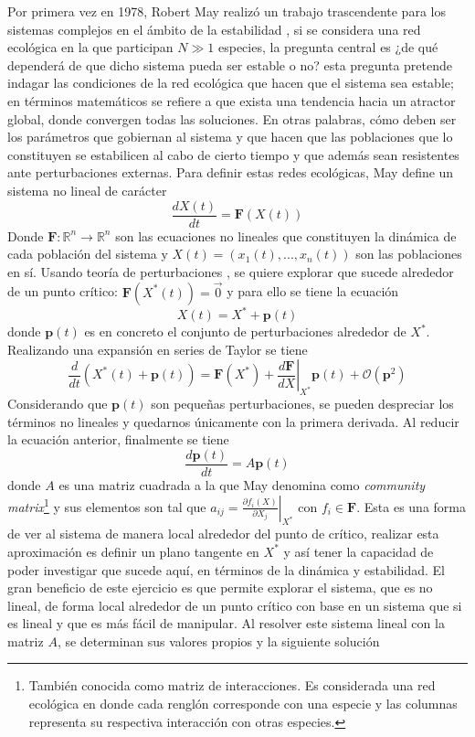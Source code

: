 Por primera vez en 1978, Robert May realizó un trabajo trascendente para los sistemas complejos en el ámbito de la estabilidad \cite{may1972will}, si se considera una red ecológica en la que participan $N\gg 1$ especies, la pregunta central es ¿de qué dependerá de que dicho sistema pueda ser estable o no? esta pregunta pretende indagar las condiciones de la red ecológica que hacen que el sistema sea estable; en términos matemáticos se refiere a que exista una tendencia hacia un atractor global, donde convergen todas las soluciones. En otras palabras, cómo deben ser los parámetros que gobiernan al sistema y que hacen que las poblaciones que lo constituyen se estabilicen al cabo de cierto tiempo y que además sean resistentes ante perturbaciones externas. Para definir estas redes ecológicas, May define un sistema no lineal de carácter
$$\frac{dX(t)}{dt}=\textbf{F}(X(t))$$
Donde $\textbf{F}:\mathbb{R}^n\to\mathbb{R}^n$ son las ecuaciones no lineales que constituyen la dinámica de cada población del sistema y $X(t)=(x_1(t),...,x_n(t))$ son las poblaciones en sí. Usando teoría de perturbaciones \cite{may2019stability}, se quiere explorar que sucede alrededor de un punto crítico: $\textbf{F}(X^*(t))=\vec{0}$ y para ello se tiene la ecuación
$$X(t)=X ^*+\textbf{p}(t)$$
donde $\textbf{p}(t)$ es en concreto el conjunto de perturbaciones alrededor de $X^*$. Realizando una expansión en series de Taylor se tiene 
$$\frac{d}{dt}\left (X^*(t)+\textbf{p}(t)\right )=\textbf{F}(X^*)+\left .\frac{d\textbf{F}}{dX}\right  |_{X^*}\textbf{p}(t)+\mathcal{O}(\textbf{p}^2)$$
Considerando que $\textbf{p}(t)$ son pequeñas perturbaciones, se pueden despreciar los términos no lineales y quedarnos únicamente con la primera derivada. Al reducir la ecuación anterior, finalmente se tiene 
$$\frac{d\textbf{p}(t)}{dt}=A\textbf{p}(t)$$
donde $A$ es una matriz cuadrada a la que May denomina como \textit{community matrix}\footnote{También conocida como matriz de interacciones. Es considerada una red ecológica en donde cada renglón corresponde con una especie y las columnas representa su respectiva interacción con otras especies.} y sus elementos son tal que $a_{ij}=\left .\frac{\partial f_i(X)}{\partial X_j}\right |_{X^*}$ con $f_i\in\textbf{F}$. Esta es una forma de ver al sistema de manera local alrededor del punto de crítico, realizar esta aproximación es definir un plano tangente en $X^*$ y así tener la capacidad de poder investigar que sucede aquí, en términos de la dinámica y estabilidad. El gran beneficio de este ejercicio es que permite explorar el sistema, que es no lineal, de forma local alrededor de un punto crítico con base en un sistema que si es lineal y que es más fácil de manipular. Al resolver este sistema lineal con la matriz $A$, se determinan sus valores propios y la siguiente solución
